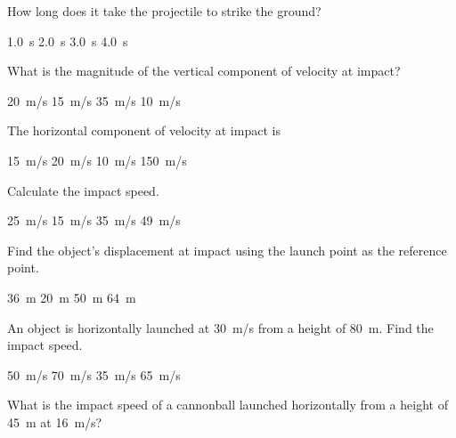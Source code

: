 \documentclass[../main-physics-workbook.tex]{subfiles}
\begin{document}
\begin{questions}
\question \label{V3NNS}
How long does it take the projectile to strike the ground?

\begin{randomizechoices}[norandomize]
    \choice \SI{1.0}{s}
    \correctchoice \SI{2.0}{s}
    \choice \SI{3.0}{s}
    \choice \SI{4.0}{s}
\end{randomizechoices}

\question 
What is the magnitude of the vertical component of velocity at impact?

\begin{randomizechoices}
    \correctchoice \SI{20}{m/s}
    \choice \SI{15}{m/s}
    \choice \SI{35}{m/s}
    \choice \SI{10}{m/s}
\end{randomizechoices}

\question 
The horizontal component of velocity at impact is

\begin{randomizechoices}
    \correctchoice \SI{15}{m/s}
    \choice \SI{20}{m/s}
    \choice \SI{10}{m/s}
    \choice \SI{150}{m/s}
\end{randomizechoices}

\question
Calculate the impact speed.

\begin{randomizechoices}
    \correctchoice \SI{25}{m/s}
    \choice \SI{15}{m/s}
    \choice \SI{35}{m/s}
    \choice \SI{49}{m/s}
\end{randomizechoices}

\question \label{fhUcL}
Find the object's displacement at impact using the launch point as the reference point.

\begin{randomizechoices}
    \correctchoice \SI{36}{m}
    \choice \SI{20}{m}
    \choice \SI{50}{m}
    \choice \SI{64}{m}
\end{randomizechoices}

\clearpage

\question
An object is horizontally launched at \SI{30}{m/s} from a height of \SI{80}{m}. Find the impact speed.

\begin{randomizechoices}
    \correctchoice \SI{50}{m/s}
    \choice \SI{70}{m/s}
    \choice \SI{35}{m/s}
    \choice \SI{65}{m/s}
\end{randomizechoices}

\question
What is the impact speed of a cannonball launched horizontally from a height of \SI{45}{m} at \SI{16}{m/s}?


\end{questions}
\end{document}

